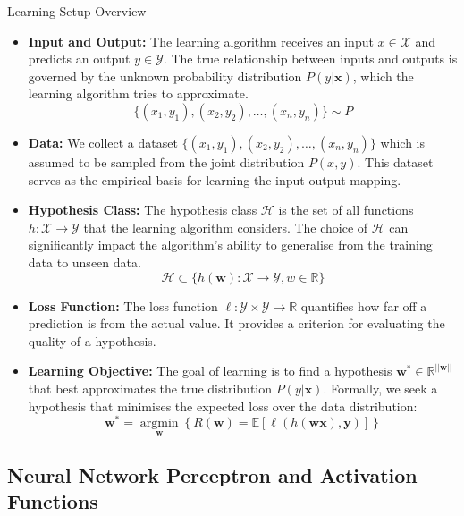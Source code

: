 \begin{definitionbox}{Learning Setup Overview}
    

\begin{itemize}
    \item \textbf{Input and Output:} The learning algorithm receives an input \( x \in \mathcal{X} \) and predicts an output \( y \in \mathcal{Y} \). The true relationship between inputs and outputs is governed by the unknown probability distribution \( P(y|\mathbf{x}) \), which the learning algorithm tries to approximate.
    $$ \{(x_1, y_1), (x_2, y_2), \ldots, (x_n, y_n)\}  \sim P$$
    
    \item \textbf{Data:} We collect a dataset \( \{(x_1, y_1), (x_2, y_2), \ldots, (x_n, y_n)\} \) which is assumed to be sampled from the joint distribution \( P(x, y) \). This dataset serves as the empirical basis for learning the input-output mapping.
    
    \item \textbf{Hypothesis Class:} The hypothesis class \( \mathcal{H} \) is the set of all functions \( h: \mathcal{X} \rightarrow \mathcal{Y} \) that the learning algorithm considers. The choice of \( \mathcal{H} \) can significantly impact the algorithm's ability to generalise from the training data to unseen data.
    $$
    \mathcal{H} \subset \{h(\mathbf{w}):\mathcal{X} \rightarrow \mathcal{Y}, w \in \mathbb{R}\}
    $$
    
    \item \textbf{Loss Function:} The loss function \( \ell: \mathcal{Y} \times \mathcal{Y} \rightarrow \mathbb{R} \) quantifies how far off a prediction is from the actual value. It provides a criterion for evaluating the quality of a hypothesis.
    
    \item \textbf{Learning Objective:} The goal of learning is to find a hypothesis \( \mathbf{w}^* \in \mathbb{R}^{||\mathbf{w}||} \) that best approximates the true distribution \( P(y|\mathbf{x}) \). Formally, we seek a hypothesis that minimises the expected loss over the data distribution: 
    \[\mathbf{w}^*=\operatorname*{argmin}_{\mathbf{w}}\left\{R(\mathbf{w})=\mathbb{E}\left[\ell(h(\mathbf{w}\mathbf{x}),\mathbf{y})\right]\right\}\]

\end{itemize}

\end{definitionbox}

\subsection{Neural Network Perceptron and Activation Functions}
